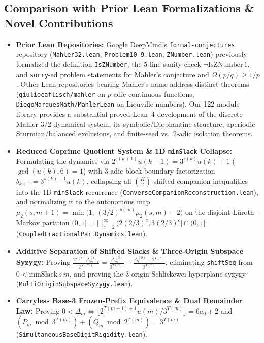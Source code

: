 \documentclass[11pt]{article}
\begin{document}
\subsection{Comparison with Prior Lean Formalizations \& Novel Contributions}
\begin{itemize}
  \item \textbf{Prior Lean Repositories:} Google DeepMind's \texttt{formal-conjectures} repository \cite{FC26} (\texttt{Mahler32.lean}, \texttt{Problem10\_9.lean}, \texttt{ZNumber.lean}) previously formalized the definition \texttt{IsZNumber}, the 5-line sanity check $\neg\mathrm{IsZNumber}\,1$, and \texttt{sorry}-ed problem statements for Mahler's conjecture and $\Omega(p/q) \ge 1/p$. Other Lean repositories bearing Mahler's name address distinct theorems (\texttt{giuliocaflisch/mahler} on $p$-adic continuous functions, \texttt{DiegoMarquesMath/MahlerLean} on Liouville numbers). Our 122-module library provides a substantial proved Lean~4 development of the discrete Mahler $3/2$ dynamical system, its symbolic/Diophantine structure, aperiodic Sturmian/balanced exclusions, and finite-seed vs.\ 2-adic isolation theorems.
  \item \textbf{Reduced Coprime Quotient System \& 1D \texttt{minSlack} Collapse:} Formulating the dynamics via $2^{s(k+1)} u(k+1) = 3^{s(k)} u(k) + 1$ ($\gcd(u(k), 6) = 1$) with 3-adic block-boundary factorization $b_{k+1} = 3^{s(k)-1} u(k)$, collapsing all $\binom{K}{2}$ shifted companion inequalities into the 1D \texttt{minSlack} recurrence (\texttt{ConverseCompanionReconstruction.lean}), and normalizing it to the autonomous map $\mu_2(s, m+1) = \min\big(1,\, (3/2)^{s(m)} \mu_2(s, m) - 2\big)$ on the disjoint L\"uroth--Markov partition $(0, 1] = \bigsqcup_{c=2}^\infty (2(2/3)^c, 3(2/3)^c] \cap (0, 1]$ (\texttt{CoupledFractionalPartDynamics.lean}).
  \item \textbf{Additive Separation of Shifted Slacks \& Three-Origin Subspace Syzygy:} Proving $\frac{2^{T(r)} \Delta^{(r)}_{m-r}}{3^{T(m)}} = \frac{\Delta^{(0)}_m}{3^{T(m)}} - \frac{\Delta^{(0)}_r - 2^{T(r)}}{3^{T(r)}}$, eliminating \texttt{shiftSeq} from $0 < \mathrm{minSlack}\, s\, m$, and proving the 3-origin Schlickewei hyperplane syzygy (\texttt{MultiOriginSubspaceSyzygy.lean}).
  \item \textbf{Carryless Base-3 Frozen-Prefix Equivalence \& Dual Remainder Law:} Proving $0 < \Delta_m \iff \lfloor 2^{T(m+1)+1} u(m) / 3^{T(m)} \rfloor = 6a_0 + 2$ and $(P_m \bmod 3^{T(m)}) + (Q_m \bmod 2^{T(m)}) = 3^{T(m)}$ (\texttt{SimultaneousBaseDigitRigidity.lean}).

\end{itemize}
\end{document}
